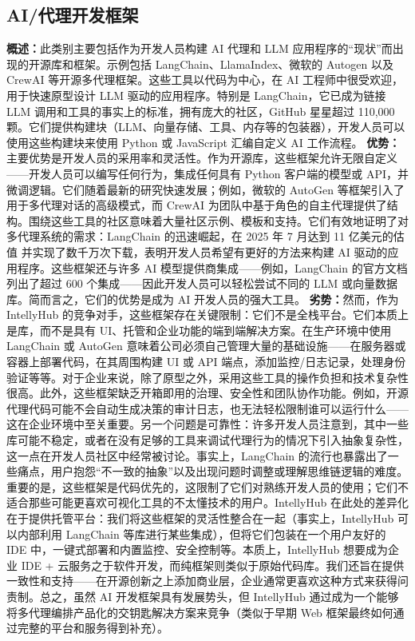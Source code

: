 \documentclass[11pt, a4paper, oneside]{article}
\begin{document}
\subsection{AI/代理开发框架}

\textbf{概述：}此类别主要包括作为开发人员构建 AI 代理和 LLM 应用程序的“现状”而出现的开源库和框架。示例包括 LangChain、LlamaIndex、微软的 Autogen 以及 CrewAI 等开源多代理框架。这些工具以代码为中心，在 AI 工程师中很受欢迎，用于快速原型设计 LLM 驱动的应用程序。特别是 LangChain，它已成为链接 LLM 调用和工具的事实上的标准，拥有庞大的社区，GitHub 星星超过 110,000 颗\cite{langchainGitHub}。它们提供构建块（LLM、向量存储、工具、内存等的包装器），开发人员可以使用这些构建块来使用 Python 或 JavaScript 汇编自定义 AI 工作流程。
\newline\newline
\textbf{优势：}主要优势是开发人员的采用率和灵活性。作为开源库，这些框架允许无限自定义——开发人员可以编写任何行为，集成任何具有 Python 客户端的模型或 API，并微调逻辑。它们随着最新的研究快速发展；例如，微软的 AutoGen 等框架引入了用于多代理对话的高级模式\cite{autogenGitHub}，而 CrewAI 为团队中基于角色的自主代理提供了结构\cite{crewaiGitHub}。围绕这些工具的社区意味着大量社区示例、模板和支持。它们有效地证明了对多代理系统的需求：LangChain 的迅速崛起，在 2025 年 7 月达到 11 亿美元的估值\cite{langchainValuation} 并实现了数千万次下载，表明开发人员希望有更好的方法来构建 AI 驱动的应用程序。这些框架还与许多 AI 模型提供商集成——例如，LangChain 的官方文档列出了超过 600 个集成\cite{langchainIntegrations}——因此开发人员可以轻松尝试不同的 LLM 或向量数据库。简而言之，它们的优势是成为 AI 开发人员的强大工具。
\newline\newline
\textbf{劣势：}然而，作为 IntellyHub 的竞争对手，这些框架存在关键限制：它们不是全栈平台。它们本质上是库，而不是具有 UI、托管和企业功能的端到端解决方案。在生产环境中使用 LangChain 或 AutoGen 意味着公司必须自己管理大量的基础设施——在服务器或容器上部署代码，在其周围构建 UI 或 API 端点，添加监控/日志记录，处理身份验证等等。对于企业来说，除了原型之外，采用这些工具的操作负担和技术复杂性很高。此外，这些框架缺乏开箱即用的治理、安全性和团队协作功能。例如，开源代理代码可能不会自动生成决策的审计日志，也无法轻松限制谁可以运行什么——这在企业环境中至关重要。另一个问题是可靠性：许多开发人员注意到，其中一些库可能不稳定，或者在没有足够的工具来调试代理行为的情况下引入抽象复杂性，这一点在开发人员社区中经常被讨论\cite{langchainCritique}。事实上，LangChain 的流行也暴露出了一些痛点，用户抱怨“不一致的抽象”以及出现问题时调整或理解思维链逻辑的难度。重要的是，这些框架是代码优先的，这限制了它们对熟练开发人员的使用；它们不适合那些可能更喜欢可视化工具的不太懂技术的用户。IntellyHub 在此处的差异化在于提供托管平台：我们将这些框架的灵活性整合在一起（事实上，IntellyHub 可以内部利用 LangChain 等库进行某些集成），但将它们包装在一个用户友好的 IDE 中，一键式部署和内置监控、安全控制等。本质上，IntellyHub 想要成为企业 IDE + 云服务之于软件开发，而纯框架则类似于原始代码库。我们还旨在提供一致性和支持——在开源创新之上添加商业层，企业通常更喜欢这种方式来获得问责制。总之，虽然 AI 开发框架具有发展势头，但 IntellyHub 通过成为一个能够将多代理编排产品化的交钥匙解决方案来竞争（类似于早期 Web 框架最终如何通过完整的平台和服务得到补充）。
\end{document}
